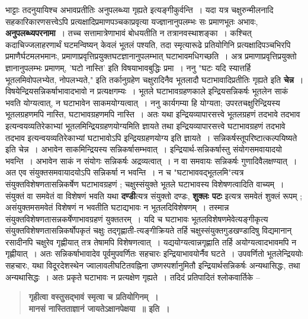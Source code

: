 {भाट्टाः तदनुयायिश्च अभावप्रतीतिः अनुपलब्ध्या गृह्यते इत्यङ्गीकुर्वन्ति~। यदा यत्र चक्षुरुन्मीलनादि सहकारिकारणसत्त्वेऽपि प्रत्यक्षादिप्रमाणपञ्चकाप्रवृत्या यज्ज्ञानानुपलम्भः सः प्रमाणभूतः अभावः, \textbf{अनुपलब्ध्यपरनामा}~। तच्च सत्तामात्रेणाभावं बोधयतीति न तत्रानवस्थाशङ्का~। कश्चित् कदाचिज्जलाहरणार्थं घटमन्विष्यन् केवलं भूतलं पश्यति, तदा स्मृत्यारूढे प्रतियोगिनि प्रत्यक्षादिपञ्चभिरपि प्रमाणैर्घटमलभमानः, प्रमाणाप्रवृत्तिप्रयुक्तघटज्ञानानुपलम्भात् घटाभावमधिगच्छति~। अत्र प्रमाणाप्रवृत्तिप्रयुक्तो ज्ञानानुपलम्भः प्रमाणम्, 'घटो नास्ति' इति विषयाभावबुद्धिः प्रमा~। ननु "घटः यदि स्यात्तर्हि भूतलमिवोपलभ्येत, नोपलभ्यते," इति तर्कानुग्रहेण चक्षुरादिनैव भूतलादौ घटाभावादिप्रतीतिः गृह्यते इति \textbf{चेन्न}~। विषयेन्द्रियसन्निकर्षाभावादभावो न प्रत्यक्षगम्यः~। भूतले घटाभावग्रहणकाले इन्द्रियसन्निकर्षः भूतलेन साकं भवति योग्यत्वात्, न घटाभावेन साकमयोग्यत्वात्~। ननु कार्यगम्या हि योग्यता; उपरतचक्षुरिन्द्रियस्य भूतलग्रहणमपि नास्ति, घटाभावग्रहणमपि नास्ति~। अतः यथा इन्द्रियव्यापारसत्त्वे भूतलग्रहणं तदभावे तदभाव इत्यन्वयव्यतिरेकाभ्यां भूतलमिन्द्रियग्रहणयोग्यमिति ज्ञायते तथा इन्द्रियव्यापारसत्त्वे घटाभावग्रहणं तदभावे तदभाव इत्यन्वयव्यतिरेकाभ्यां घटाभावोऽपि इन्द्रियग्रहणयोग्य इति ज्ञायते~। सन्निकर्षस्तूपरिष्टात्कल्पयिष्यते इति चेन्न~। अभावेन साकमिन्द्रियस्य सन्निकर्षासम्भवात्~। इन्द्रियार्थ-सन्निकर्षास्तु संयोगसमवायादयो भवन्ति~। अभावेन साकं न संयोगः सन्निकर्षः अद्रव्यत्वात्~। न वा समवायः सन्निकर्षः गुणादिवैलक्षण्यात्~। अत एव संयुक्तसमवायादयोऽपि सन्निकर्षा न भवन्ति~। न च "घटाभाववद्भूतलमि"त्यत्र संयुक्तविशेषणतासन्निकर्षेण घटाभावग्रहणं ; चक्षुस्संयुक्ते भूतले घटाभावस्य विशेषणत्वादिति वाच्यम्~। संयुक्तं वा समवेतं वा विशेषणं भवति यथा \textbf{दण्डी}त्यत्र संयुक्तो दण्डः, \textbf{शुक्लः पटः} इत्यत्र समवेतं शुक्लं रूपम् ; असंयुक्तमसमवेतं विशेषणं न भवतीति घटाद्यभावः न भूतलदिविशेषणम्~। तस्मान्न संयुक्तविशेषणतासन्नकर्षेणाभावग्रहणं युक्ततरम्~। यदि च घटाभावः भूतलविशेषणमेवेत्यङ्गीकृत्य संयुक्तविशेषणतासन्निकर्षोपकृतं चक्षुः तद्गृह्णाती-त्यङ्गीक्रियते तर्हि चक्षुस्संयुक्तगुडखण्डादिषु विद्यमानान् रसादीनपि चक्षुरेव गृह्णीयात् तत्र तेषामपि विशेषणत्वात्~। यद्ययोग्यत्वान्नगृह्णाति तर्हि अयोग्यत्वादभावमपि न गृह्णीयात्~। अतः सन्निकर्षाभावादेव पूर्वमुपवर्णितः सहचारः इन्द्रियाभावयोर्नैव घटते~। उपवर्णितो भूतलेन्द्रिययोः सहचारः, यथा विदूरदेशस्थेन ज्वालावलीघटितवह्निना उष्णस्पर्शानुमितौ इन्द्रियार्थसन्निकर्षः अन्यथासिद्धः, तथा अन्यथासिद्धः~। अतः प्रकृते घटाभावः न प्रत्यक्षेण गृह्यते~। तदिदं प्रतिपादितं श्लोकवार्तिके –
\begin{verse}
\textbf{गृहीत्वा वस्तुसद्भावं स्मृत्वा च प्रतियोगिनम्~। }\\
\textbf{मानसं नास्तिताज्ञानं जायतेऽक्षानपेक्षया~॥  इति~। }

\end{verse}}
